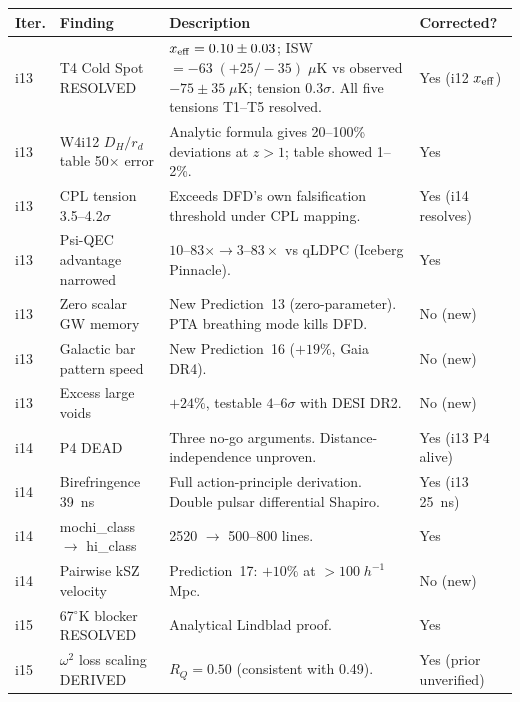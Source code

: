 \documentclass[11pt,a4paper]{article}
\begin{document}
\begin{longtable}{p{1cm}p{3cm}p{7cm}p{2cm}}
\toprule
\textbf{Iter.} & \textbf{Finding} & \textbf{Description} & \textbf{Corrected?} \\
\midrule
\endfirsthead

i13 & T4 Cold Spot RESOLVED & $x_{\rm eff} = 0.10 \pm 0.03$; ISW
$= -63\;(+25/-35)\;\mu$K vs observed $-75 \pm 35\;\mu$K; tension
$0.3\sigma$. All five tensions T1--T5 resolved. & Yes (i12 $x_{\rm eff}$) \\

i13 & W4i12 $D_H/r_d$ table 50$\times$ error & Analytic formula gives
20--100\% deviations at $z > 1$; table showed 1--2\%. & Yes \\

i13 & CPL tension 3.5--4.2$\sigma$ & Exceeds DFD's own falsification
threshold under CPL mapping. & Yes (i14 resolves) \\

i13 & Psi-QEC advantage narrowed & $10$--$83\times \to 3$--$83\times$
vs qLDPC (Iceberg Pinnacle). & Yes \\

i13 & Zero scalar GW memory & New Prediction~13 (zero-parameter). PTA
breathing mode kills DFD. & No (new) \\

i13 & Galactic bar pattern speed & New Prediction~16 ($+19\%$, Gaia
DR4). & No (new) \\

i13 & Excess large voids & $+24\%$, testable $4$--$6\sigma$ with DESI
DR2. & No (new) \\

i14 & P4 DEAD & Three no-go arguments. Distance-independence unproven. &
Yes (i13 P4 alive) \\

i14 & Birefringence 39~ns & Full action-principle derivation. Double
pulsar differential Shapiro. & Yes (i13 25~ns) \\

i14 & mochi\_class $\to$ hi\_class & 2520 $\to$ 500--800 lines. &
Yes \\

i14 & Pairwise kSZ velocity & Prediction~17: $+10\%$ at $> 100\;
h^{-1}$ Mpc. & No (new) \\

i15 & 67$^\circ$K blocker RESOLVED & Analytical Lindblad proof. &
Yes \\

i15 & $\omega^2$ loss scaling DERIVED & $R_Q = 0.50$ (consistent with
0.49). & Yes (prior unverified) \\


\end{longtable}
\end{document}

